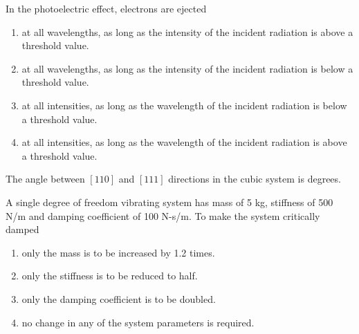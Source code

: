     \bigskip

    \item In the photoelectric effect, electrons are ejected
    \begin{enumerate}
        \item at all wavelengths, as long as the intensity of the incident radiation is above a threshold value.
        \item at all wavelengths, as long as the intensity of the incident radiation is below a threshold value.
        \item at all intensities, as long as the wavelength of the incident radiation is below a threshold value.
        \item at all intensities, as long as the wavelength of the incident radiation is above a threshold value.
    \end{enumerate}
    
    \bigskip

    \item The angle between $[110]$ and $[111]$ directions in the cubic system is \underline{\hspace{1cm}} degrees.
    \bigskip
    \item A single degree of freedom vibrating system has mass of 5 kg, stiffness of 500 N/m and damping
    coefficient of 100 N-s/m. To make the system critically damped 
    \begin{enumerate}
        \item only the mass is to be increased by 1.2 times. 
        \item only the stiffness is to be reduced to half. 
        \item only the damping coefficient is to be doubled. 
        \item no change in any of the system parameters is required.
    \end{enumerate}

